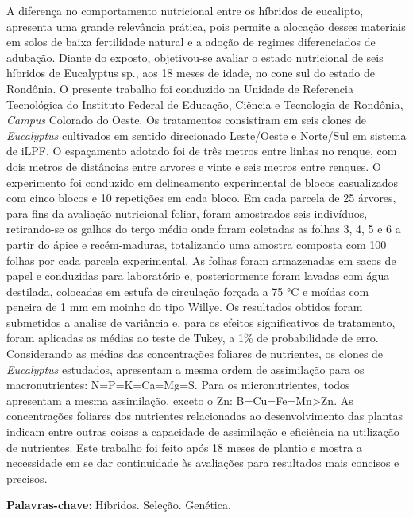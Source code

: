 \documentclass[article,12pt,onesidea,4paper,english,brazil]{abntex2}
\begin{document}
	\noindent A diferença no comportamento nutricional entre os híbridos de eucalipto, apresenta
	uma grande relevância prática, pois permite a alocação desses materiais em solos
	de baixa fertilidade natural e a adoção de regimes diferenciados de adubação.
	Diante do exposto, objetivou-se avaliar o estado nutricional de seis híbridos de
	Eucalyptus sp., aos 18 meses de idade, no cone sul do estado de Rondônia. O
	presente trabalho foi conduzido na Unidade de Referencia Tecnológica do Instituto
	Federal de Educação, Ciência e Tecnologia de Rondônia, \textit{Campus} Colorado do
	Oeste. Os tratamentos consistiram em seis clones de  \textit{Eucalyptus} cultivados em
	sentido direcionado Leste/Oeste e Norte/Sul em sistema de iLPF. O espaçamento
	adotado foi de três metros entre linhas no renque, com dois metros de distâncias
	entre arvores e vinte e seis metros entre renques. O experimento foi conduzido em
	delineamento experimental de blocos casualizados com cinco blocos e 10 repetições
	em cada bloco. Em cada parcela de 25 árvores, para fins da avaliação nutricional
	foliar, foram amostrados seis indivíduos, retirando-se os galhos do terço médio onde
	foram coletadas as folhas 3, 4, 5 e 6 a partir do ápice e recém-maduras, totalizando
	uma amostra composta com 100 folhas por cada parcela experimental. As folhas
	foram armazenadas em sacos de papel e conduzidas para laboratório e,
	posteriormente foram lavadas com água destilada, colocadas em estufa de
	circulação forçada a 75 °C e moídas com peneira de 1 mm em moinho do tipo
	Willye. Os resultados obtidos foram submetidos a analise de variância e, para os
	efeitos significativos de tratamento, foram aplicadas as médias ao teste de Tukey, a
	1\% de probabilidade de erro. Considerando as médias das concentrações foliares de
	nutrientes, os clones de \textit{Eucalyptus} estudados, apresentam a mesma ordem de
	assimilação para os macronutrientes: N=P=K=Ca=Mg=S. Para os micronutrientes,
	todos apresentam a mesma assimilação, exceto o Zn: B=Cu=Fe=Mn>Zn. As
	concentrações foliares dos nutrientes relacionadas ao desenvolvimento das plantas
	indicam entre outras coisas a capacidade de assimilação e eficiência na utilização
	de nutrientes. Este trabalho foi feito após 18 meses de plantio e mostra a
	necessidade em se dar continuidade às avaliações para resultados mais concisos e
	precisos.
	
	\vspace{\onelineskip}
	
	\noindent
	\textbf{Palavras-chave}: Híbridos. Seleção. Genética.
	
\end{document}
